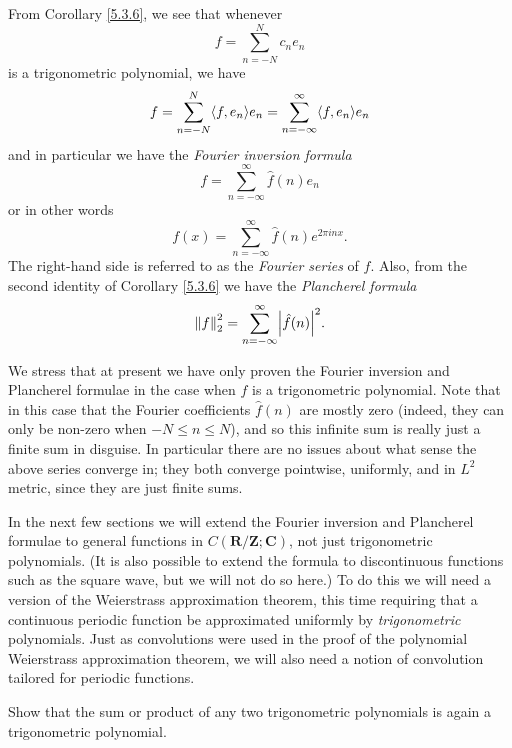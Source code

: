 \begin{additional corollary}\label{ac 5.3.1}
From Corollary \ref{5.3.6}, we see that whenever
\[
    f = \sum_{n = -N}^N c_n e_n
\]
is a trigonometric polynomial, we have
\[
    f = \sum_{n = -N}^N \inner*{f, e_n} e_n = \sum_{n = -\infty}^\infty \inner*{f, e_n} e_n
\]
and in particular we have the \emph{Fourier inversion formula}
\[
    f = \sum_{n = -\infty}^\infty \hat{f}(n) e_n
\]
or in other words
\[
    f(x) = \sum_{n = -\infty}^\infty \hat{f}(n) e^{2 \pi i n x}.
\]
The right-hand side is referred to as the \emph{Fourier series} of \(f\).
Also, from the second identity of Corollary \ref{5.3.6} we have the \emph{Plancherel formula}
\[
    \norm*{f}_2^2 = \sum_{n = -\infty}^\infty \abs*{\hat{f}(n)}^2.
\]
\end{additional corollary}

\begin{remark}\label{5.3.8}
    We stress that at present we have only proven the Fourier inversion and Plancherel formulae in the case when \(f\) is a trigonometric polynomial.
    Note that in this case that the Fourier coefficients \(\hat{f}(n)\) are mostly zero (indeed, they can only be non-zero when \(-N \leq n \leq N\)), and so this infinite sum is really just a finite sum in disguise.
    In particular there are no issues about what sense the above series converge in;
    they both converge pointwise, uniformly, and in \(L^2\) metric, since they are just finite sums.
\end{remark}

\begin{note}
    In the next few sections we will extend the Fourier inversion and Plancherel formulae to general functions in \(C(\mathbf{R} / \mathbf{Z} ; \mathbf{C})\), not just trigonometric polynomials.
    (It is also possible to extend the formula to discontinuous functions such as the square wave, but we will not do so here.)
    To do this we will need a version of the Weierstrass approximation theorem, this time requiring that a continuous periodic function be approximated uniformly by \emph{trigonometric} polynomials.
    Just as convolutions were used in the proof of the polynomial Weierstrass approximation theorem, we will also need a notion of convolution tailored for periodic functions.
\end{note}

\exercisesection

\begin{exercise}\label{ex 5.3.1}
    Show that the sum or product of any two trigonometric polynomials is again a trigonometric polynomial.
\end{exercise}


